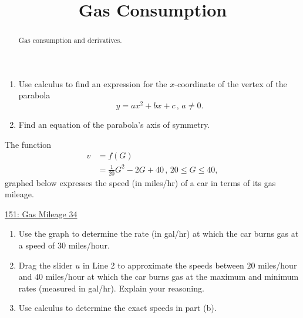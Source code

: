\documentclass{ximera}
\title{Gas Consumption}
\begin{document}
\begin{abstract}
Gas consumption and derivatives.
\end{abstract}
\maketitle


\begin{question}
\begin{enumerate}

\item Use calculus to find an expression for the $x$-coordinate of the vertex of the parabola
\[
    y = ax^2 + bx + c \, , \, a\neq 0.
\]

\item Find an equation of the parabola's axis of symmetry.

\end{enumerate}
\end{question}

\begin{question} \label{Qghlfgvnhhgeyghhg}
The function 
\begin{align*}
    v  &= f(G)    \\
         &= \frac{1}{20}G^2 - 2G + 40 \, , \, 20\leq G \leq 40 ,
\end{align*}
graphed below expresses the speed (in miles/hr) of a car in terms of its gas mileage.

\begin{onlineOnly}
    \begin{center}
\end{center}
\end{onlineOnly}

\href{https://www.desmos.com/calculator/r375yhaxuj}{151: Gas Mileage 34}

\begin{enumerate}
\item Use the graph to determine the rate (in gal/hr) at which the car burns gas at a speed of $30$ miles/hour.

\item Drag the slider $u$ in Line 2 to approximate the speeds between $20$ miles/hour and $40$ miles/hour at which the car burns gas at the maximum and minimum rates (measured in gal/hr). Explain your reasoning.

\item Use calculus to determine the exact speeds in part (b). 
\end{enumerate}


\end{question}
\end{document}
